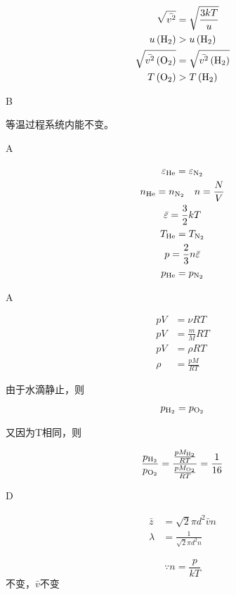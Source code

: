 \documentclass[b5paper,opensource]{./template/qyxf-book}
\begin{document}
\solve

$$
\begin{aligned} \sqrt {\bar{v^{2}}} &=\sqrt{\frac{3kT}{u}} \\
u\left(\ce{H2}\right)& > u\left(\ce{H2}\right) \\
\sqrt {\bar{v^{2}}\left(\ce{O2}\right)}& = \sqrt {\bar{v^{2}}\left(\ce{H2}\right) }\\
T\left(\ce{O2}\right)&>T\left(\ce{H2}\right) 
\end{aligned}
$$

B

\solve 等温过程系统内能不变。

A

\solve

\begin{gather*}
\varepsilon_{\ce{He}}=\varepsilon_{\ce{N2}}\\
n_{\ce{He}}=n_{\ce{N2}}\quad n=\frac{N}{V}\\
\bar{\varepsilon}=\frac{3}{2}kT\\
T_{\ce{He}}=T_{\ce{N2}}\\
p=\frac{2}{3}n\bar{\varepsilon}\\
p_{\ce{He}}=p_{\ce{N2}}
\end{gather*}

A

\solve

$$
\begin{aligned} 
p V & = \nu R T \\ p V & = \frac { m } { M } R T \\
p V & = \rho R T \\
\rho & = \frac { p M } { R T }
\end{aligned}
$$

由于水滴静止，则
$$
p_{\ce{H2}} =p_{\ce{O2}}
$$

又因为T相同，则

$$
\frac { p _ {\ce{H2}} } { p _ {\ce{O2}} } = \frac { \frac { p M _ {\ce{H2}} } { R T } } { \frac { p M_{\ce{O2}}}{ R T}}=\frac{1}{16}
$$

D

\solve

$$
\begin{aligned}
 \bar { z } & = \sqrt { 2 } \pi d ^ { 2 } \bar { v } n \\ \lambda & = \frac { 1 } { \sqrt { 2 } \pi d ^ { 2 } n } 
\end{aligned}
$$

$$
\because n = \frac { p } { k T }
$$不变，$ \bar { v }$不变
\end{document}
